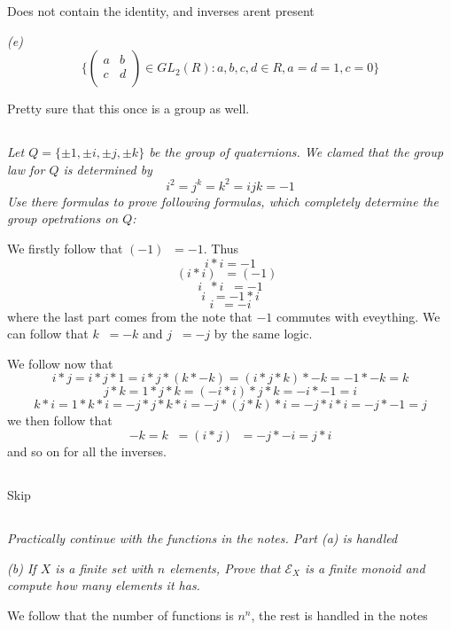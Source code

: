 \documentclass[11pt,oneside,titlepage]{book}
\DeclareMathOperator \inv {^{-1}}
\newcommand{\set}[1]{\{ #1 \}}
\begin{document}
Does not contain the identity, and inverses arent present

\textit{(e)
  $$\set{
  \begin{pmatrix}
    a & b \\
    c & d \\
  \end{pmatrix} \in GL_2(R): a, b, c, d \in R, a = d = 1, c = 0}
  $$
}

Pretty sure that this once is a group as well.

\subsection{}

\textit{Let $Q = \set{\pm 1, \pm i, \pm j, \pm k}$ be the group of quaternions.
  We clamed that the group law for $Q$ is determined by
  $$i^2 = j^k = k^2 = i j k = -1$$
  Use there formulas to prove following formulas, which completely determine the group
  opetrations on $Q$:
}

We firstly follow that $(-1)\inv = -1$. Thus
$$i * i = -1$$
$$(i * i)\inv = (-1)\inv$$
$$i\inv * i\inv = -1$$
$$i\inv = -1 * i $$
$$i\inv = -i$$
where the last part comes from the note that $-1$ commutes with eveything.
We can follow that $k\inv = -k$ and $j\inv = -j$ by the same logic.

We follow now that
$$i * j = i * j * 1 = i * j * (k * -k) = (i * j * k) * -k = -1 * -k = k$$
$$j * k = 1 * j * k = (-i * i) * j * k = -i * -1 = i$$
$$k * i =  1 * k * i = -j * j * k * i = -j * (j * k) * i = -j * i * i = -j * -1 = j$$
we then follow that
$$-k = k\inv = (i * j) \inv = -j * -i = j * i$$
and so on for all the inverses.

\subsection{}

Skip

\subsection{}

\textit{Practically continue with the functions in the notes. Part (a)
is handled}

\textit{(b) If $X$ is a finite set with $n$ elements, Prove that
  $\mathcal{E}_X$ is a finite monoid and compute how many elements it has.}

We follow that the number of functions is $n^n$, the rest is handled in the notes
\end{document}
